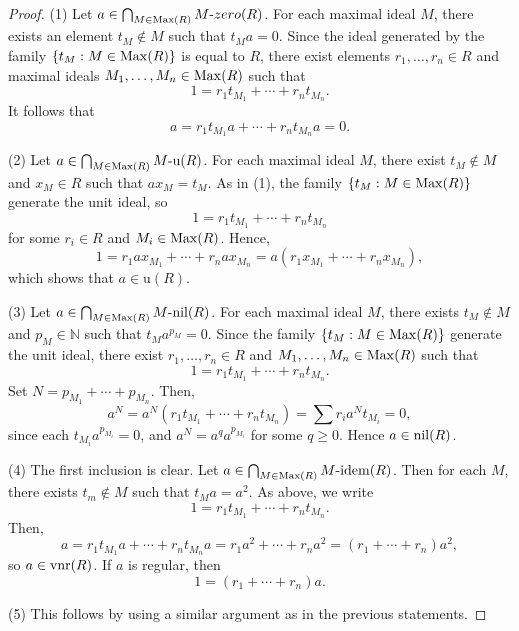 \documentclass[12pt]{article}
\def\u{\mathrm{u}}
\def\idem{{\rm idem}}
\def\nil{{\rm nil}}
\def\vnr{{\rm vnr}}
\def\z{{zero}}
\def\Max{{\rm Max}}
\begin{document}
\begin{proof}
(1)  Let \( a \in \bigcap_{M \in \Max(R)} M\text{-}\z(R) \). For each maximal ideal \( M \), there exists an element \( t_M \notin M \) such that \( t_M a = 0 \). Since the ideal generated by the family \( \{ t_M : M \in \Max(R) \} \) is equal to \( R \), there exist elements \( r_1, \dots, r_n \in R \) and maximal ideals \( M_1, \dots, M_n \in \Max(R) \) such that
\[
1 = r_1 t_{M_1} + \cdots + r_n t_{M_n}.
\]
It follows that
\[
a = r_1 t_{M_1} a + \cdots + r_n t_{M_n} a = 0.
\]

(2) Let \( a \in \bigcap_{M \in \Max(R)} M\text{-}\u(R) \). For each maximal ideal \( M \), there exist \( t_M \notin M \) and \( x_M \in R \) such that \( a x_M = t_M \). As in (1), the family \(\{ t_M : M \in \Max(R) \} \) generate the unit ideal, so
\[
1 = r_1 t_{M_1} + \cdots + r_n t_{M_n}
\]
for some \( r_i \in R \) and \( M_i \in \Max(R) \). Hence,
\[
1 = r_1 a x_{M_1} + \cdots + r_n a x_{M_n} = a(r_1 x_{M_1} + \cdots + r_n x_{M_n}),
\]
which shows that \( a \in \u(R) \).

(3) Let \( a \in \bigcap_{M \in \Max(R)} M\text{-}\nil(R) \). For each maximal ideal \( M \), there exists \( t_M \notin M \) and \( p_M \in \mathbb{N} \) such that \( t_M a^{p_{M}} = 0 \). Since  the family \(\{ t_M : M \in \Max(R) \} \) generate the unit ideal, there exist \( r_1, \dots, r_n \in R \) and \( M_1, \dots, M_n \in \Max(R) \) such that
\[
1 = r_1 t_{M_1} + \cdots + r_n t_{M_n}.
\]
Set \( N = p_{M_1} + \cdots + p_{M_n} \). Then,
\[
a^N = a^N (r_1 t_{M_1} + \cdots + r_n t_{M_n}) = \sum r_i a^N t_{M_i} = 0,
\]
since each \( t_{M_i} a^{p_{M_i}} = 0 \), and \( a^N = a^{q} a^{p_{M_i}} \) for some \( q \ge 0 \). Hence \( a \in \nil(R) \).

(4) The first inclusion is clear. Let \( a \in \bigcap_{M \in \Max(R)} M\text{-}\idem(R) \). Then for each \( M \), there exists \( t_m \notin M \) such that \( t_M a = a^2 \). As above, we write
\[
1 = r_1 t_{M_1} + \cdots + r_n t_{M_n}.
\]
Then,
\[
a = r_1 t_{M_1} a + \cdots + r_n t_{M_n} a = r_1 a^2 + \cdots + r_n a^2 = (r_1 + \cdots + r_n) a^2,
\]
so \( a \in \vnr(R) \). If \( a \) is regular, then
\[
1 = (r_1 + \cdots + r_n) a.
\]

(5) This follows by using a similar argument as in the previous statements.

\end{proof}
\end{document}
